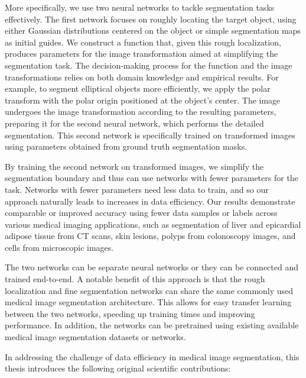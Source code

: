 More specifically, we use two neural networks to tackle segmentation tasks effectively. The first network focuses on roughly locating the target object, using either Gaussian distributions centered on the object or simple segmentation maps as initial guides. We construct a function that, given this rough localization, produces parameters for the image transformation aimed at simplifying the segmentation task. The decision-making process for the function and the image transformations relies on both domain knowledge and empirical results. For example, to segment elliptical objects more efficiently, we apply the polar transform with the polar origin positioned at the object's center. The image undergoes the image transformation according to the resulting parameters, preparing it for the second neural network, which performs the detailed segmentation. This second network is specifically trained on transformed images using parameters obtained from ground truth segmentation masks.

By training the second network on transformed images, we simplify the segmentation boundary and thus can use networks with fewer parameters for the task. Networks with fewer parameters need less data to train, and so our approach naturally leads to increases in data efficiency. Our results demonstrate comparable or improved accuracy using fewer data samples or labels across various medical imaging applications, such as segmentation of liver and epicardial adipose tissue from CT scans, skin lesions, polyps from colonoscopy images, and cells from microscopic images.

The two networks can be separate neural networks or they can be connected and trained end-to-end. A notable benefit of this approach is that the rough localization and fine segmentation networks can share the same commonly used medical image segmentation architecture. This allows for easy transfer learning between the two networks, speeding up training times and improving performance. In addition, the networks can be pretrained using existing available medical image segmentation datasets or networks.

In addressing the challenge of data efficiency in medical image segmentation, this thesis introduces the following original scientific contributions:

